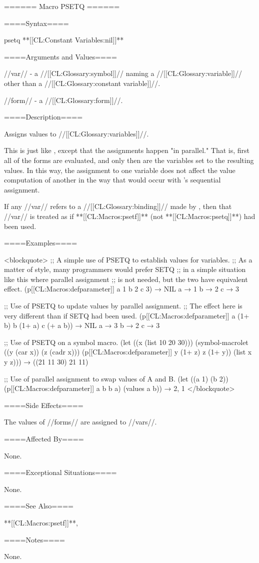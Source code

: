 ====== Macro PSETQ ======

====Syntax====

\DefmacWithValues psetq {} {**[[CL:Constant Variables:nil]]**}


====Arguments and Values====

//var// - a //[[CL:Glossary:symbol]]// naming a //[[CL:Glossary:variable]]// other than a //[[CL:Glossary:constant variable]]//.

//form// - a //[[CL:Glossary:form]]//.

====Description====

Assigns values to //[[CL:Glossary:variables]]//.

This is just like , except that the assignments happen "in parallel." That is, first all of the forms are evaluated, and only then are the variables set to the resulting values. In this way, the assignment to one variable does not affect the value computation of another in the way that would occur with 's sequential assignment.

If any //var// refers to a //[[CL:Glossary:binding]]// made by , then that //var// is treated as if **[[CL:Macros:psetf]]** (not **[[CL:Macros:psetq]]**) had been used.

====Examples====

<blockquote> ;; A simple use of PSETQ to establish values for variables. ;; As a matter of style, many programmers would prefer SETQ ;; in a simple situation like this where parallel assignment ;; is not needed, but the two have equivalent effect. (p[[CL:Macros:defparameter]] a 1 b 2 c 3) → NIL a → 1 b → 2 c → 3

;; Use of PSETQ to update values by parallel assignment. ;; The effect here is very different than if SETQ had been used. (p[[CL:Macros:defparameter]] a (1+ b) b (1+ a) c (+ a b)) → NIL a → 3 b → 2 c → 3

;; Use of PSETQ on a symbol macro. (let ((x (list 10 20 30))) (symbol-macrolet ((y (car x)) (z (cadr x))) (p[[CL:Macros:defparameter]] y (1+ z) z (1+ y)) (list x y z))) → ((21 11 30) 21 11)

;; Use of parallel assignment to swap values of A and B. (let ((a 1) (b 2)) (p[[CL:Macros:defparameter]] a b b a) (values a b)) → 2, 1 </blockquote>

====Side Effects====

The values of //forms// are assigned to //vars//.

====Affected By====

None.

====Exceptional Situations====

None.

====See Also====

**[[CL:Macros:psetf]]**, 

====Notes====

None.


